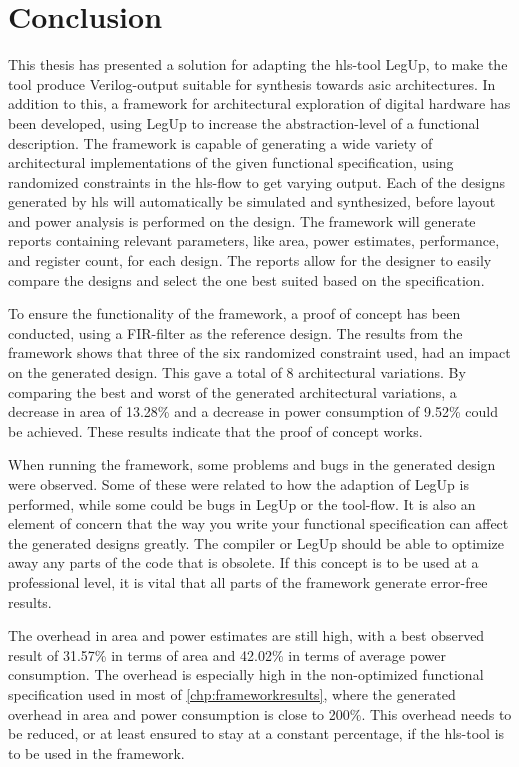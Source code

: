 \chapter{Conclusion}
\label{chp:conclusion} 
This thesis has presented a solution for adapting the \gls{hls}-tool LegUp, to make the tool produce Verilog-output suitable for synthesis towards \gls{asic} architectures. In addition to this, a framework for architectural exploration of digital hardware has been developed, using LegUp to increase the abstraction-level of a functional description. The framework is capable of generating a wide variety of architectural implementations of the given functional specification, using randomized constraints in the \gls{hls}-flow to get varying output. Each of the designs generated by \gls{hls} will automatically be simulated and synthesized, before layout and power analysis is performed on the design. The framework will generate reports containing relevant parameters, like area, power estimates, performance, and register count, for each design. The reports allow for the designer to easily compare the designs and select the one best suited based on the specification.

To ensure the functionality of the framework, a proof of concept has been conducted, using a FIR-filter as the reference design. The results from the framework shows that three of the six randomized constraint used, had an impact on the generated design. This gave a total of 8 architectural variations. By comparing the best and worst of the generated architectural variations, a decrease in area of 13.28\% and a decrease in power consumption of 9.52\% could be achieved. These results indicate that the proof of concept works.

When running the framework, some problems and bugs in the generated design were observed. Some of these were related to how the adaption of LegUp is performed, while some could be bugs in LegUp or the tool-flow. It is also an element of concern that the way you write your functional specification can affect the generated designs greatly. The compiler or LegUp should be able to optimize away any parts of the code that is obsolete. If this concept is to be used at a professional level, it is vital that all parts of the framework generate error-free results. 

The overhead in area and power estimates are still high, with a best observed result of 31.57\% in terms of area and 42.02\% in terms of average power consumption. The overhead is especially high in the non-optimized functional specification used in most of \cref{chp:frameworkresults}, where the generated overhead in area and power consumption is close to 200\%. This overhead needs to be reduced, or at least ensured to stay at a constant percentage, if the \gls{hls}-tool is to be used in the framework.

